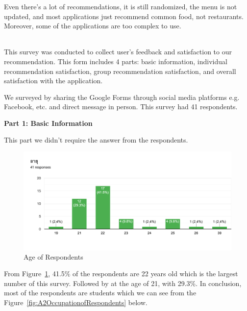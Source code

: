 \documentclass[12pt,oneside,openright,a4paper]{cpe-english-project}
\begin{document}
Even there’s a lot of recommendations, it is still randomized, the menu is not updated, and most applications just recommend common food, not restaurants. Moreover, some of the applications are too complex to use.


 \\


This survey was conducted to collect user’s feedback and satisfaction to our recommendation. This form includes 4 parts: basic information, individual recommendation satisfaction, group recommendation satisfaction, and overall satisfaction with the application.

We surveyed by sharing the Google Forms through social media platforms e.g. Facebook, etc. and direct message in person. This survey had 41 respondents.

\textbf{Part 1: Basic Information}

This part we didn’t require the answer from the respondents.

\begin{figure}[H]\centering
\includegraphics[width=350pt]{./images/A2AgeofRespondents.png}
\caption{Age of Respondents}\label{fig:A2AgeofRespondents}
\end{figure}\vspace{-24pt}

From Figure~\ref{fig:A2AgeofRespondents}, 41.5\% of the respondents are 22 years old which is the largest number of this survey. Followed by at the age of 21, with 29.3\%. In conclusion, most of the respondents are students which we can see from the Figure~\ref{fig:A2OccupationofRespondents} below.
\end{document}
